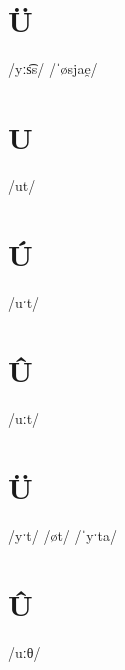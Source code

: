 \documentclass[10pt,a4paper,twoside]{book}
\begin{document}
\section*{Ü}

\begin{multicols}{3}
 {/yːs͡s/} {}
 {/ˈøsjae̯/} {}
\end{multicols}

\section*{U}

\begin{multicols}{3}
 {/ut/} {}
\end{multicols}

\section*{Ú}

\begin{multicols}{3}
 {/uˑt/} {}
\end{multicols}

\section*{Û}

\begin{multicols}{3}
 {/uːt/} {}
\end{multicols}

\section*{Ü}

\begin{multicols}{3}
 {/yˑt/} {}
 {/øt/} {}
 {/ˈyˑta/} {}
\end{multicols}

\section*{Û}

\begin{multicols}{3}
 {/uːθ/} {}
\end{multicols}
\end{document}
